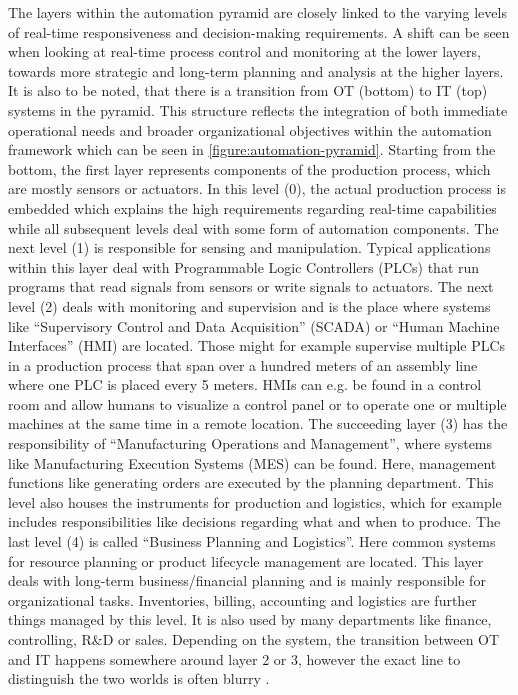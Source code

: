     \noindent The layers within the automation pyramid are closely linked to the varying levels of real-time responsiveness and decision-making requirements. A shift can be seen when looking at real-time process control and monitoring at the lower layers, towards more strategic and long-term planning and analysis at the higher layers. It is also to be noted, that there is a transition from OT (bottom) to IT (top) systems in the pyramid. This structure reflects the integration of both immediate operational needs and broader organizational objectives within the automation framework which can be seen in \autoref{figure:automation-pyramid}. Starting from the bottom, the first layer represents components of the production process, which are mostly sensors or actuators. In this level (0), the actual production process is embedded which explains the high requirements regarding real-time capabilities while all subsequent levels deal with some form of automation components. The next level (1) is responsible for sensing and man\-ip\-u\-la\-tion. Typical applications within this layer deal with Programmable Logic Controllers (PLCs) that run programs that read signals from sensors or write signals to actuators. The next level (2) deals with monitoring and supervision and is the place where systems like ``Supervisory Control and Data Acquisition'' (SCADA) or ``Human Machine Interfaces'' (HMI) are located. Those might for example supervise multiple PLCs in a production process that span over a hundred meters of an assembly line where one PLC is placed every 5 meters. HMIs can e.g. be found in a control room and allow humans to visualize a control panel or to operate one or multiple machines at the same time in a remote location. The succeeding layer (3) has the responsibility of ``Manufacturing Operations and Management'', where systems like Manufacturing Execution Systems (MES) can be found. Here, management functions like generating orders are executed by the planning department. This level also houses the instruments for production and logistics, which for example includes responsibilities like decisions regarding what and when to produce. The last level (4) is called ``Business Planning and Logistics''. Here common systems for resource planning or product lifecycle management are located. This layer deals with long-term business/financial planning and is mainly responsible for organizational tasks. Inventories, billing, accounting and logistics are further things managed by this level. It is also used by many departments like finance, controlling, R\&D or sales. Depending on the system, the transition between OT and IT happens somewhere around layer 2 or 3, however the exact line to distinguish the two worlds is often blurry \cite{umh_automation_pyramid}.\newline

